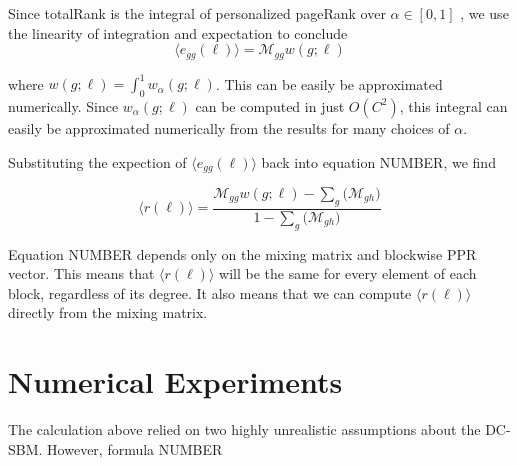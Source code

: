 \documentclass[12pt]{article}
\begin{document}
Since totalRank is the integral of personalized pageRank over $\alpha \in [0,1]$ \cite{boldi:2005} \cite{Peel:2018}, we use the linearity of integration and expectation to conclude
\begin{equation}
  \langle e_{gg}(\ell) \rangle = \mathcal{M}_{gg} w(g; \ell) 
\end{equation}

where $w(g; \ell) = \int_0^1 w_\alpha(g; \ell)$.  This can be easily be approximated numerically.  Since $w_\alpha (g;\ell)$ can be computed in just $O(C^2)$, this integral can easily be approximated numerically from the results for many choices of $\alpha$.

Substituting the expection of $\langle e_{gg}(\ell)\rangle$ back into equation NUMBER, we find

\begin{equation}
  \langle r(\ell) \rangle = \frac{\mathcal{M}_{gg} w(g; \ell) - \sum_g \big( \mathcal{M}_{gh} \big)}{1 - \sum_g \big( \mathcal{M}_{gh} \big)}
\end{equation}

Equation NUMBER depends only on the mixing matrix and blockwise PPR vector.  This means that $\langle r(\ell) \rangle$ will be the same for every element of each block, regardless of its degree.  It also means that we can compute $\langle r(\ell) \rangle$ directly from the mixing matrix.

\section{Numerical Experiments}
The calculation above relied on two highly unrealistic assumptions about the DC-SBM.  However, formula NUMBER 
\end{document}
